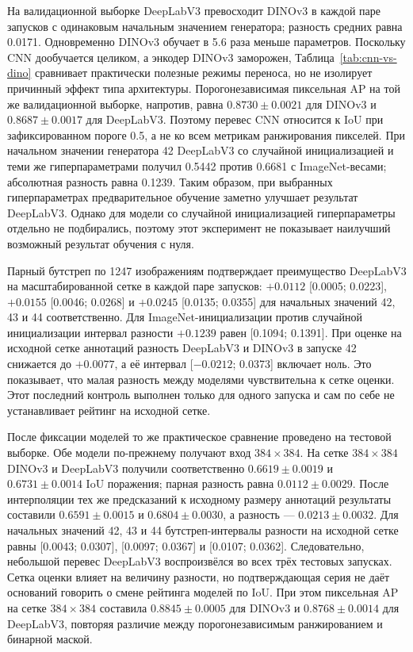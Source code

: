 \documentclass[a4paper,12pt]{extarticle}
\begin{document}
На валидационной выборке DeepLabV3 превосходит DINOv3 в каждой паре запусков с одинаковым
начальным значением генератора; разность средних равна 0.0171. Одновременно DINOv3
обучает в 5.6 раза меньше параметров. Поскольку CNN дообучается целиком, а
энкодер DINOv3 заморожен, Таблица~\ref{tab:cnn-vs-dino} сравнивает практически
полезные режимы переноса, но не изолирует причинный эффект типа архитектуры.
Порогонезависимая пиксельная AP на той же валидационной выборке, напротив,
равна $0.8730\pm0.0021$ для DINOv3 и $0.8687\pm0.0017$ для DeepLabV3. Поэтому
перевес CNN относится к IoU при зафиксированном пороге 0.5, а не ко всем
метрикам ранжирования пикселей.
При начальном значении генератора 42 DeepLabV3 со случайной инициализацией и
теми же гиперпараметрами получил 0.5442 против 0.6681 с ImageNet-весами;
абсолютная разность равна 0.1239. Таким образом, при выбранных гиперпараметрах
предварительное обучение заметно улучшает результат DeepLabV3. Однако для модели
со случайной инициализацией гиперпараметры отдельно не подбирались, поэтому этот
эксперимент не показывает наилучший возможный результат обучения с нуля.

Парный бутстреп по 1247 изображениям подтверждает преимущество
DeepLabV3 на масштабированной сетке в каждой паре запусков:
$+0.0112$ [0.0005; 0.0223], $+0.0155$ [0.0046; 0.0268] и $+0.0245$
[0.0135; 0.0355] для начальных значений 42, 43 и 44 соответственно.
Для ImageNet-инициализации против случайной инициализации интервал разности
$+0.1239$ равен [0.1094; 0.1391]. При оценке на исходной сетке аннотаций
разность DeepLabV3 и DINOv3 в запуске 42 снижается до $+0.0077$, а её
интервал [$-0.0212$; 0.0373] включает ноль. Это показывает, что малая
разность между моделями чувствительна к сетке оценки. Этот последний контроль
выполнен только для одного запуска и сам по себе не устанавливает рейтинг на
исходной сетке.

После фиксации моделей то же практическое сравнение проведено на тестовой выборке. Обе
модели по-прежнему получают вход $384\times384$. На сетке $384\times384$
DINOv3 и DeepLabV3 получили соответственно $0.6619\pm0.0019$ и
$0.6731\pm0.0014$ IoU поражения; парная разность равна
$0.0112\pm0.0029$. После интерполяции тех же предсказаний к исходному размеру
аннотаций результаты составили $0.6591\pm0.0015$ и $0.6804\pm0.0030$, а
разность --- $0.0213\pm0.0032$. Для начальных значений 42, 43 и 44
бутстреп-интервалы разности на исходной сетке равны [0.0043; 0.0307],
[0.0097; 0.0367] и [0.0107; 0.0362]. Следовательно, небольшой перевес
DeepLabV3 воспроизвёлся во всех трёх тестовых запусках. Сетка оценки влияет на
величину разности, но подтверждающая серия не даёт оснований говорить о смене
рейтинга моделей по IoU. При этом пиксельная AP на сетке $384\times384$
составила $0.8845\pm0.0005$ для DINOv3 и $0.8768\pm0.0014$ для DeepLabV3,
повторяя различие между порогонезависимым ранжированием и бинарной маской.
\end{document}
